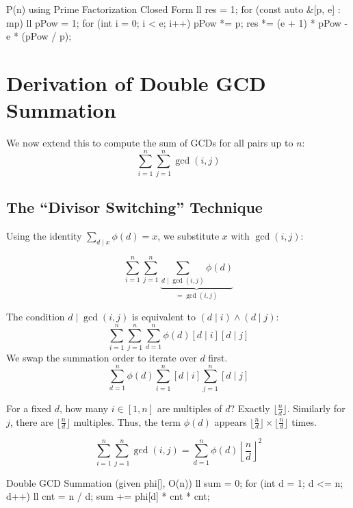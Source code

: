 \documentclass[11pt]{article}
\begin{document}
\begin{vscode}{P(n) using Prime Factorization Closed Form}
ll res = 1;
for (const auto &[p, e] : mp)
{
    ll pPow = 1;
    for (int i = 0; i < e; i++) pPow *= p;
    res *= (e + 1) * pPow - e * (pPow / p);
}
\end{vscode}

\section{Derivation of Double GCD Summation}
\label{sec:double_gcd}

We now extend this to compute the sum of GCDs for all pairs up to $n$:
\[ \sum_{i=1}^n \sum_{j=1}^n \gcd(i, j) \]

\subsection{The ``Divisor Switching'' Technique}

\begin{derivation}

    Using the identity $\sum_{d \mid x} \phi(d) = x$, we substitute $x$ with $\gcd(i, j)$:

    \[ \sum_{i=1}^n \sum_{j=1}^n \underbrace{\sum_{d \mid \gcd(i, j)} \phi(d)}_{=\gcd(i,j)} \]

    The condition $d \mid \gcd(i, j)$ is equivalent to $(d \mid i) \land (d \mid j)$:
    \[ \sum_{i=1}^n \sum_{j=1}^n \sum_{d = 1}^n \phi(d) [d \mid i][d \mid j]\]
    We swap the summation order to iterate over $d$ first.
    \[ \sum_{d=1}^n \phi(d) \sum_{i = 1}^n [d \mid i] \sum_{j = 1}^n [d \mid j] \]

    For a fixed $d$, how many $i \in [1, n]$ are multiples of $d$? Exactly $\lfloor \frac{n}{d} \rfloor$.
    Similarly for $j$, there are $\lfloor \frac{n}{d} \rfloor$ multiples.
    Thus, the term $\phi(d)$ appears $\lfloor \frac{n}{d} \rfloor \times \lfloor \frac{n}{d} \rfloor$ times.
\end{derivation}

\begin{resultbox}
    \begin{equation}
        \sum_{i=1}^n \sum_{j=1}^n \gcd(i, j) = \sum_{d=1}^n \phi(d) \left\lfloor \frac{n}{d} \right\rfloor^2 \label{eq:double_gcd_result}
    \end{equation}
\end{resultbox}

\begin{vscode}{Double GCD Summation (given phi[], O(n))}
ll sum = 0;
for (int d = 1; d <= n; d++)
{
    ll cnt = n / d;
    sum += phi[d] * cnt * cnt;
}
\end{vscode}
\pagebreak
\end{document}

